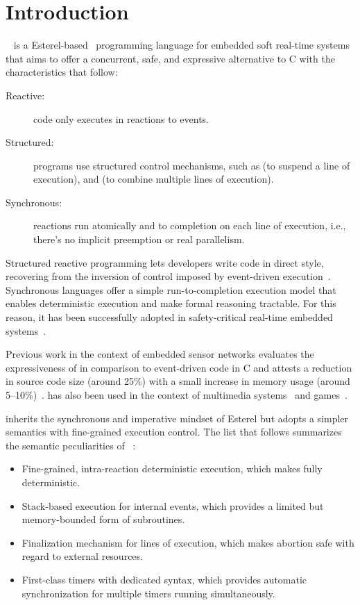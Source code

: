 \section{Introduction}
\label{sec.intro}

\CEU~\cite{ceu.sensys13,ceu.tecs17} is a Esterel-based~\cite{esterel.ieee91}
programming language for embedded soft real-time systems that aims to offer a
concurrent, safe, and expressive alternative to C with the characteristics that
follow:
%
\begin{description}
\item [Reactive:] code only executes in reactions to events.
\item [Structured:] programs use structured control mechanisms, such as
     (to suspend a line of execution), and  (to combine
    multiple lines of execution).
\item [Synchronous:] reactions run atomically and to completion on each line of
    execution, i.e., there's no implicit preemption or real parallelism.
\end{description}
%
Structured reactive programming lets developers write code in direct style,
recovering from the inversion of control imposed by event-driven
execution~\cite{rp.deprecating,rp.rescala,sync_async.cooperative}.
%
Synchronous languages offer a simple run-to-completion execution model that
enables deterministic execution and make formal reasoning tractable.
For this reason, it has been successfully adopted in safety-critical real-time
embedded systems~\cite{rp.twelve}.

Previous work in the context of embedded sensor networks evaluates the
expressiveness of \CEU in comparison to event-driven code in C and attests a
reduction in source code size (around 25\%) with a small increase in memory
usage (around 5--10\%)~\cite{ceu.sensys13}.
%
\CEU has also been used in the context of multimedia
systems~\cite{ceumedia.webmedia16} and games~\cite{ceu.TODO.sbgames18}. %

\CEU inherits the synchronous and imperative mindset of Esterel but adopts a
simpler semantics with fine-grained execution control.
%
The list that follows summarizes the semantic peculiarities of
\CEU~\cite{ceu.tecs17}:
%
\begin{itemize}
    \item Fine-grained, intra-reaction deterministic execution, which makes
          \CEU fully deterministic.
    \item Stack-based execution for internal events, which provides a limited
          but memory-bounded form of subroutines.
    \item Finalization mechanism for lines of execution, which makes abortion
          safe with regard to external resources.
    \item First-class timers with dedicated syntax, which provides automatic
          synchronization for multiple timers running simultaneously.
\end{itemize}

